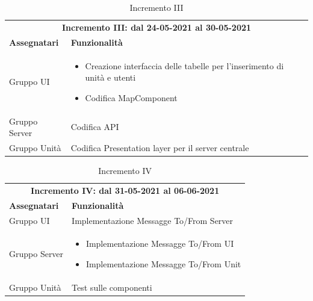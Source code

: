  \begin{table} [h!]
	\begin{center}
		\begin{tabular} { m{4cm}  m{11cm}  }	
			\multicolumn{2}{c}{	\textbf{Incremento III: dal 24-05-2021 al 30-05-2021}} \\
			\rowcolor{lightgray}
			\textbf{Assegnatari} & \textbf{Funzionalità} \\
			Gruppo UI & \begin{itemize}
				\item Creazione interfaccia delle tabelle per l'inserimento di unità e utenti
				\item Codifica MapComponent	
			\end{itemize}\\		
			Gruppo Server & Codifica API\\
			Gruppo Unità & Codifica Presentation layer per il server centrale
		
		\end{tabular}
		\caption{Incremento III}
	\end{center}
\end{table}

\begin{table} [h!]
	\begin{center}
		\begin{tabular} { m{4cm}  m{11cm}  }	
			\multicolumn{2}{c}{	\textbf{Incremento IV: dal 31-05-2021 al 06-06-2021}} \\
			\rowcolor{lightgray}
			\textbf{Assegnatari} & \textbf{Funzionalità} \\
			Gruppo UI & Implementazione Messagge To/From Server\\	
			Gruppo Server & \begin{itemize}
				\item Implementazione Messagge To/From UI
				\item Implementazione Messagge To/From Unit
			\end{itemize}\\		
			Gruppo Unità & Test sulle componenti\\
			
		\end{tabular}
		\caption{Incremento IV}
	\end{center}
\end{table}

